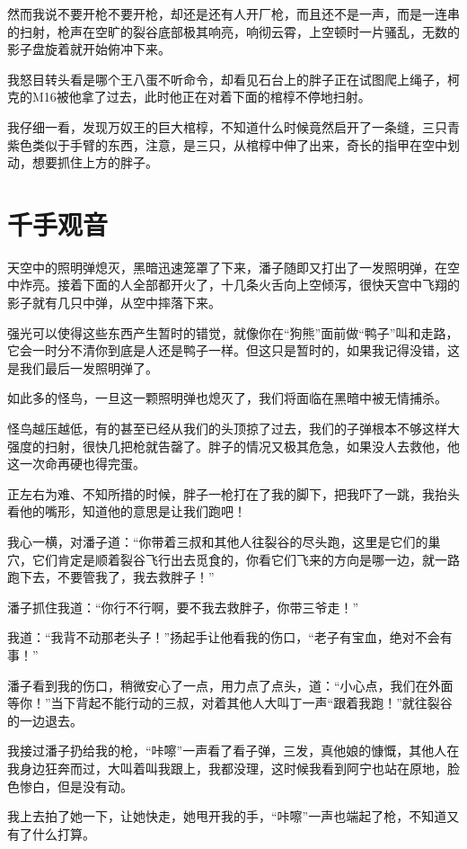 然而我说不要开枪不要开枪，却还是还有人开厂枪，而且还不是一声，而是一连串的扫射，枪声在空旷的裂谷底部极其响亮，响彻云霄，上空顿时一片骚乱，无数的影子盘旋着就开始俯冲下来。

我怒目转头看是哪个王八蛋不听命令，却看见石台上的胖子正在试图爬上绳子，柯克的M16被他拿了过去，此时他正在对着下面的棺椁不停地扫射。

我仔细一看，发现万奴王的巨大棺椁，不知道什么时候竟然启开了一条缝，三只青紫色类似于手臂的东西，注意，是三只，从棺椁中伸了出来，奇长的指甲在空中划动，想要抓住上方的胖子。

\chapter{千手观音}

天空中的照明弹熄灭，黑暗迅速笼罩了下来，潘子随即又打出了一发照明弹，在空中炸亮。接着下面的人全部都开火了，十几条火舌向上空倾泻，很快天宫中飞翔的影子就有几只中弹，从空中摔落下来。

强光可以使得这些东西产生暂时的错觉，就像你在“狗熊”面前做“鸭子”叫和走路，它会一时分不清你到底是人还是鸭子一样。但这只是暂时的，如果我记得没错，这是我们最后一发照明弹了。

如此多的怪鸟，一旦这一颗照明弹也熄灭了，我们将面临在黑暗中被无情捕杀。

怪鸟越压越低，有的甚至已经从我们的头顶掠了过去，我们的子弹根本不够这样大强度的扫射，很快几把枪就告罄了。胖子的情况又极其危急，如果没人去救他，他这一次命再硬也得完蛋。

正左右为难、不知所措的时候，胖子一枪打在了我的脚下，把我吓了一跳，我抬头看他的嘴形，知道他的意思是让我们跑吧！

我心一横，对潘子道：“你带着三叔和其他人往裂谷的尽头跑，这里是它们的巢穴，它们肯定是顺着裂谷飞行出去觅食的，你看它们飞来的方向是哪一边，就一路跑下去，不要管我了，我去救胖子！”

潘子抓住我道：“你行不行啊，要不我去救胖子，你带三爷走！”

我道：“我背不动那老头子！”扬起手让他看我的伤口，“老子有宝血，绝对不会有事！”

潘子看到我的伤口，稍微安心了一点，用力点了点头，道：“小心点，我们在外面等你！”当下背起不能行动的三叔，对着其他人大叫丁一声“跟着我跑！”就往裂谷的一边退去。

我接过潘子扔给我的枪，“咔嚓”一声看了看子弹，三发，真他娘的慷慨，其他人在我身边狂奔而过，大叫着叫我跟上，我都没理，这时候我看到阿宁也站在原地，脸色惨白，但是没有动。

我上去拍了她一下，让她快走，她甩开我的手，“咔嚓”一声也端起了枪，不知道又有了什么打算。

